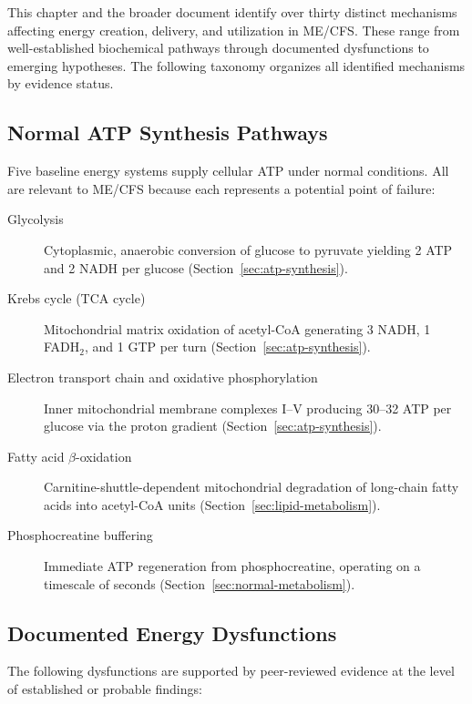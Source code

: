 This chapter and the broader document identify over thirty distinct mechanisms affecting energy creation, delivery, and utilization in ME/CFS. These range from well-established biochemical pathways through documented dysfunctions to emerging hypotheses. The following taxonomy organizes all identified mechanisms by evidence status.

\subsection{Normal ATP Synthesis Pathways}

Five baseline energy systems supply cellular ATP under normal conditions. All are relevant to ME/CFS because each represents a potential point of failure:

\begin{description}
    \item[Glycolysis] Cytoplasmic, anaerobic conversion of glucose to pyruvate yielding 2 ATP and 2 NADH per glucose (Section~\ref{sec:atp-synthesis}).
    \item[Krebs cycle (TCA cycle)] Mitochondrial matrix oxidation of acetyl-CoA generating 3 NADH, 1 FADH$_2$, and 1 GTP per turn (Section~\ref{sec:atp-synthesis}).
    \item[Electron transport chain and oxidative phosphorylation] Inner mitochondrial membrane complexes I--V producing 30--32 ATP per glucose via the proton gradient (Section~\ref{sec:atp-synthesis}).
    \item[Fatty acid $\beta$-oxidation] Carnitine-shuttle-dependent mitochondrial degradation of long-chain fatty acids into acetyl-CoA units (Section~\ref{sec:lipid-metabolism}).
    \item[Phosphocreatine buffering] Immediate ATP regeneration from phosphocreatine, operating on a timescale of seconds (Section~\ref{sec:normal-metabolism}).
\end{description}

\subsection{Documented Energy Dysfunctions}

The following dysfunctions are supported by peer-reviewed evidence at the level of established or probable findings:

